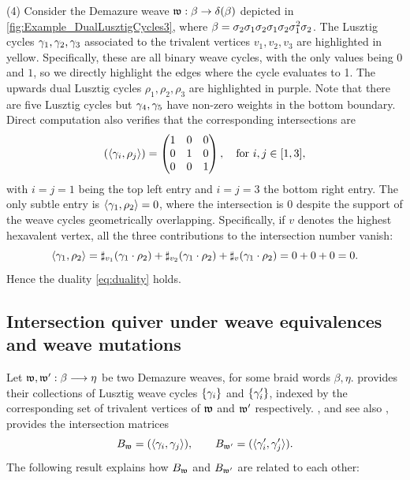 \begin{example}
\noindent (4) Consider the Demazure weave $\mathfrak{w}:\beta\to\delta(\beta)$ depicted in \cref{fig:Example_DualLusztigCycles3}, where $\beta=\sigma_2\sigma_1\sigma_2\sigma_1\sigma_2\sigma_1^2\sigma_2$. The Lusztig cycles $\gamma_1,\gamma_2,\gamma_3$ associated to the trivalent vertices $v_1,v_2,v_3$ are highlighted in yellow. Specifically, these are all binary weave cycles, with the only values being $0$ and $1$, so we directly highlight the edges where the cycle evaluates to 1. The upwards dual Lusztig cycles $\rho_1,\rho_2,\rho_3$
 are highlighted in purple. Note that there are five Lusztig cycles but $\gamma_4,\gamma_5$ have non-zero weights in the bottom boundary. Direct computation also verifies that the corresponding intersections are
$$(\langle\gamma_i, \rho_j\rangle)=\begin{pmatrix}
1 & 0 & 0\\
0 & 1 & 0\\
0 & 0 & 1
\end{pmatrix},\quad \mbox{for }i,j\in[1,3],$$
with $i=j=1$ being the top left entry and $i=j=3$ the bottom right entry. The only subtle entry is $\langle \gamma_1,\rho_2\rangle=0$, where the intersection is 0 despite the support of the weave cycles geometrically overlapping. Specifically, if $v$ denotes the highest hexavalent vertex, all the three contributions to the intersection number vanish:
$$\langle \gamma_1,\rho_2\rangle=\sharp_{v_1}(\gamma_1 \cdot \rho_2)+\sharp_{v_2}(\gamma_1 \cdot \rho_2)+\sharp_{v}(\gamma_1 \cdot \rho_2)=0+0+0=0.$$
Hence the duality \eqref{eq:duality} holds.\sbs
\end{example}


\subsection{Intersection quiver under weave equivalences and weave mutations}\label{ssec:intersection_Lusztig_cycles_weave_operations} Let $\mathfrak{w},\mathfrak{w}':\beta\longrightarrow\eta$ be two Demazure weaves, for some braid words $\beta,\eta$.  provides their collections of Lusztig weave cycles $\{\gamma_i\}$ and $\{\gamma'_i\}$, indexed by the corresponding set of trivalent vertices of $\mathfrak{w}$ and $\mathfrak{w}'$ respectively. , and see also , provides the intersection matrices
$$B_{\mathfrak{w}}=(\langle\gamma_i,\gamma_j\rangle),\qquad B_{\mathfrak{w}'}=(\langle\gamma'_i,\gamma'_j\rangle).$$
The following result explains how $B_{\mathfrak{w}}$ and $B_{\mathfrak{w}'}$ are related to each other:

